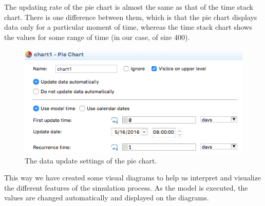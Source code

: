 The updating rate of the pie chart is almost the same as that of the time stack chart. There is one difference between them, which is that the pie chart displays data only for a particular moment of time, whereas the time stack chart shows the values for some range of time (in our case, of size 400).

\begin{figure}[H]
  \centering
  \includegraphics[height=0.3\textwidth]{img/screens/charts/charts6}
  \caption{The data update settings of the pie chart.}
\end{figure}

This way we have created some visual diagrams to help us interpret and visualize the different features of the simulation process. As the model is executed, the values are changed automatically and displayed on the diagrams.